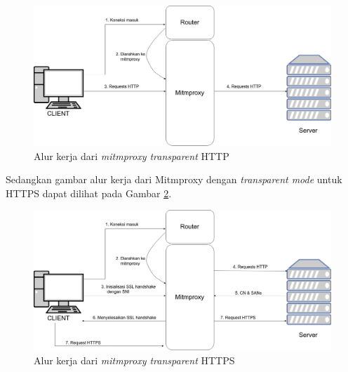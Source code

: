 \begin{figure}[H]
	\centering
	\includegraphics[width=\linewidth]{images/bab3/mitmproxyhttp}
	\caption{Alur kerja dari \textit{mitmproxy transparent} HTTP}
	\label{mitmproxyhttp}
\end{figure}

Sedangkan gambar alur kerja dari Mitmproxy dengan \textit{transparent mode} untuk HTTPS dapat dilihat pada Gambar \ref{mitmproxyhttps}.

\begin{figure}[H]
	\centering
	\includegraphics[width=\linewidth]{images/bab3/mitmproxyhttps}
	\caption{Alur kerja dari \textit{mitmproxy transparent} HTTPS}
	\label{mitmproxyhttps}
\end{figure}

